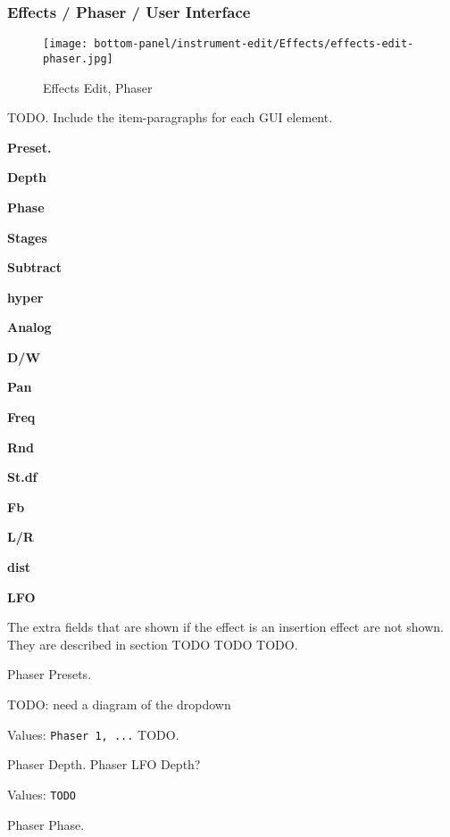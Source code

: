 \subsubsection{Effects / Phaser / User Interface}
\label{subsubsec:effects_edit_phaser_ui}

\begin{figure}[H]
   \centering 
   \texttt{[image: bottom-panel/instrument-edit/Effects/effects-edit-phaser.jpg]}
   \caption{Effects Edit, Phaser}
   \label{fig:effects_edit_phaser}
\end{figure}

   TODO. Include the item-paragraphs for each GUI element.

   \begin{enumber}
      \item \textbf{Preset.}
      \item \textbf{Depth}
      \item \textbf{Phase}
      \item \textbf{Stages}
      \item \textbf{Subtract}
      \item \textbf{hyper}
      \item \textbf{Analog}
      \item \textbf{D/W}
      \item \textbf{Pan}
      \item \textbf{Freq}
      \item \textbf{Rnd}
      \item \textbf{St.df}
      \item \textbf{Fb}
      \item \textbf{L/R}
      \item \textbf{dist}
      \item \textbf{LFO}
   \end{enumber}

   The extra fields that are shown if the effect is an insertion effect are
   not shown.  They are described in section TODO TODO TODO.

   Phaser Presets.

   TODO: need a diagram of the dropdown

   Values: \texttt{Phaser 1, ...} TODO.

   Phaser Depth. Phaser LFO Depth?

   Values: \texttt{TODO}

   Phaser Phase.

